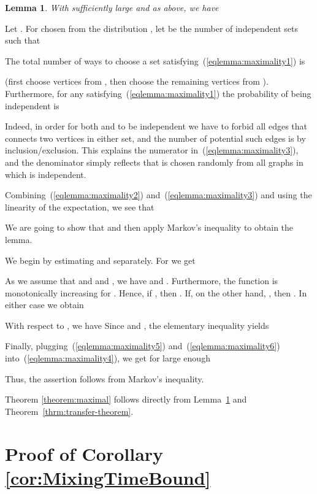 \documentclass[a4paper,10pt]{article}
\makeatletter
\newtheorem{lemma}{Lemma}\renewcommand{\thelemma}{\arabic{lemma}}
\newenvironment{proof}{\noindent{\bf Proof\@:}}{\hfill \\}
\newcommand\Lem{Lemma}
\newcommand\Thm{Theorem}
\makeatother
\begin{document}
\begin{lemma}\label{lemma:maximality}
With  sufficiently large and  as above, we have

\end{lemma}
\begin{proof}
Let .
For  chosen from the distribution ,
let  be the number of independent sets  such that
	
The total number of ways to choose a set  satisfying~(\ref{eqlemma:maximality1}) is
	
(first choose  vertices from , then choose the remaining 
vertices from ).
Furthermore, for any  satisfying~(\ref{eqlemma:maximality1}) the probability of being independent is
	
Indeed, in order for both  and  to be independent we have to forbid all edges
that connects two vertices in either set, and the number of potential such edges is
	 by inclusion/exclusion.
This explains the numerator in~(\ref{eqlemma:maximality3}), and the denominator simply reflects that  is chosen randomly
from all graphs in which  is independent.

Combining~(\ref{eqlemma:maximality2}) and~(\ref{eqlemma:maximality3}) and using the linearity of the expectation, we see that
	
We are going to show that  and then apply Markov's inequality to obtain the lemma.

We begin by estimating  and  separately.
For  we get
	
As we assume that 
 and  and , we have
	 and .
Furthermore, the function  is monotonically increasing for .
Hence, if , then .
If, on the other hand, , then
	.
In either case we obtain
	
With respect to , we have 
Since  and , the elementary inequality  yields
	
Finally, plugging~(\ref{eqlemma:maximality5}) and~(\ref{eqlemma:maximality6}) into~(\ref{eqlemma:maximality4}), we get
for  large enough
	
Thus, the assertion follows from Markov's inequality.
\end{proof}


\noindent
Theorem \ref{theorem:maximal} follows directly from \Lem~\ref{lemma:maximality} and \Thm~\ref{thrm:transfer-theorem}.






\section{Proof of Corollary \ref{cor:MixingTimeBound}}\label{sec:cor:MixingTimeBound}
\end{document}
